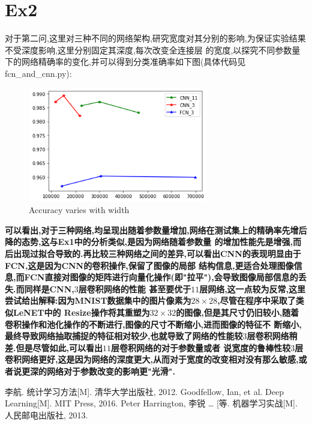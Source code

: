 \documentclass[UTF8,a4paper,11pt]{ctexart}
\begin{document}
\section{Ex2}
\par 对于第二问,这里对三种不同的网络架构,研究宽度对其分别的影响,为保证实验结果不受深度影响,这里分别固定其深度,每次改变全连接层
的宽度,以探究不同参数量下的网络精确率的变化,并可以得到分类准确率如下图(具体代码见fcn\_and\_cnn.py):
\begin{figure}[H]
	\centering
	\includegraphics[width=0.7\textwidth,height=0.5\textwidth]{2.png}
	\caption{Accuracy varies with width}
\end{figure}
\textbf{可以看出,对于三种网络,均呈现出随着参数量增加,网络在测试集上的精确率先增后降的态势,这与Ex1中的分析类似,是因为网络随着参数量
的增加性能先是增强,而后出现过拟合导致的.再比较三种网络之间的差异,可以看出CNN的表现明显由于FCN,这是因为CNN的卷积操作,保留了图像的局部
结构信息,更适合处理图像信息,而FCN直接对图像的矩阵进行向量化操作(即"拉平"),会导致图像局部信息的丢失.而同样是CNN,$3$层卷积网络的性能
甚至要优于$11$层网络,这一点较为反常,这里尝试给出解释:因为MNIST数据集中的图片像素为$28\times 28$,尽管在程序中采取了类似LeNET中的
Resize操作将其重塑为$32\times 32$的图像,但是其尺寸仍旧较小,随着卷积操作和池化操作的不断进行,图像的尺寸不断缩小,进而图像的特征不
断缩小,最终导致网络抽取捕捉的特征相对较少,也就导致了网络的性能较$3$层卷积网络稍差.但是尽管如此,可以看出$11$层卷积网络的对于参数量或者
说宽度的鲁棒性较$3$层卷积网络更好,这是因为网络的深度更大,从而对于宽度的改变相对没有那么敏感,或者说更深的网络对于参数改变的影响更"光滑".}

\newpage
\begin{thebibliography}{3}  
	 李航. 统计学习方法[M]. 清华大学出版社, 2012.
	 Goodfellow, Ian, et al. Deep Learning[M]. MIT Press, 2016. 	
	 Peter Harrington, 李锐 … [等. 机器学习实战[M]. 人民邮电出版社, 2013.
\end{thebibliography}
\end{document}
